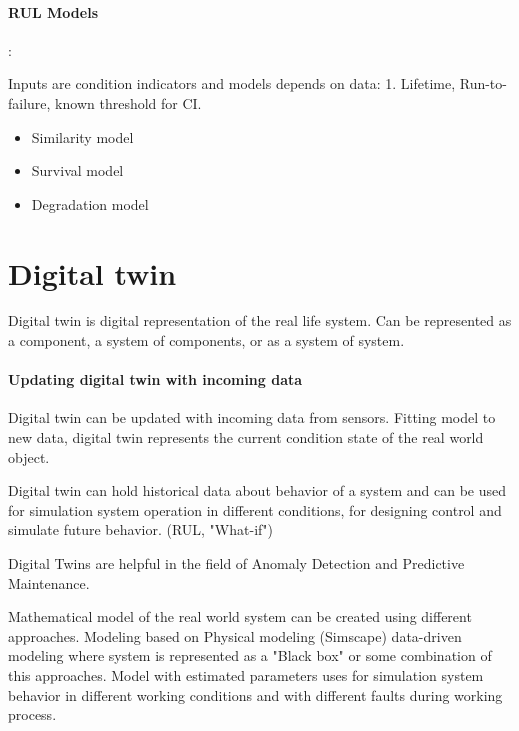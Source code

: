 \paragraph{RUL Models}:

Inputs are condition indicators and models depends on data: 1. Lifetime,
Run-to-failure, known threshold for CI.

\begin{itemize}
    \item Similarity model 
    \item Survival model
    \item Degradation model
\end{itemize}


\section{Digital twin}

Digital twin is digital representation of the real life system. Can be
represented as a component, a system of components, or as a system of
system.  

\paragraph{Updating digital twin with incoming data} 

Digital twin can be updated with incoming data from sensors. Fitting model
to new data, digital twin represents the current condition state of the
real world object.

Digital twin can hold historical data about behavior of a system
and can be used for simulation system operation in different conditions,
for designing control and simulate future behavior. (RUL, "What-if")

Digital Twins are helpful in the field of Anomaly Detection and Predictive
Maintenance.

Mathematical model of the real world system can be created using different
approaches. Modeling based on Physical modeling (Simscape) data-driven
modeling where system is represented as a "Black box" or some combination
of this approaches.
Model with estimated parameters uses for simulation system behavior in
different working conditions and with different faults during working
process.

